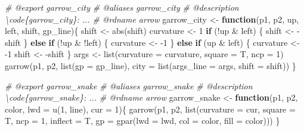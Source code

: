 \documentclass[
]{article}
\newenvironment{Shaded}{\begin{snugshade}}{\end{snugshade}}
\newcommand{\AttributeTok}[1]{\textcolor[rgb]{0.77,0.63,0.00}{#1}}
\newcommand{\CommentTok}[1]{\textcolor[rgb]{0.56,0.35,0.01}{\textit{#1}}}
\newcommand{\ControlFlowTok}[1]{\textcolor[rgb]{0.13,0.29,0.53}{\textbf{#1}}}
\newcommand{\DecValTok}[1]{\textcolor[rgb]{0.00,0.00,0.81}{#1}}
\newcommand{\FunctionTok}[1]{\textcolor[rgb]{0.00,0.00,0.00}{#1}}
\newcommand{\NormalTok}[1]{#1}
\newcommand{\OtherTok}[1]{\textcolor[rgb]{0.56,0.35,0.01}{#1}}
\newcommand{\SpecialCharTok}[1]{\textcolor[rgb]{0.00,0.00,0.00}{#1}}
\begin{document}
\begin{Shaded}
\begin{Highlighting}[]
\CommentTok{\#\textquotesingle{} @export garrow\_city}
\CommentTok{\#\textquotesingle{} @aliases garrow\_city}
\CommentTok{\#\textquotesingle{} @description \textbackslash{}code\{garrow\_city\}: ...}
\CommentTok{\#\textquotesingle{} @rdname arrow}
\NormalTok{garrow\_city }\OtherTok{\textless{}{-}} \ControlFlowTok{function}\NormalTok{(p1, p2, up, left, shift, gp\_line)\{}
\NormalTok{  shift }\OtherTok{\textless{}{-}} \FunctionTok{abs}\NormalTok{(shift)}
\NormalTok{  curvature }\OtherTok{\textless{}{-}} \DecValTok{1}
  \ControlFlowTok{if}\NormalTok{ (}\SpecialCharTok{!}\NormalTok{up }\SpecialCharTok{\&}\NormalTok{ left) \{}
\NormalTok{    shift }\OtherTok{\textless{}{-}} \SpecialCharTok{{-}}\NormalTok{shift}
\NormalTok{  \} }\ControlFlowTok{else} \ControlFlowTok{if}\NormalTok{ (}\SpecialCharTok{!}\NormalTok{up }\SpecialCharTok{\&} \SpecialCharTok{!}\NormalTok{left) \{}
\NormalTok{    curvature }\OtherTok{\textless{}{-}} \SpecialCharTok{{-}}\DecValTok{1}
\NormalTok{  \} }\ControlFlowTok{else} \ControlFlowTok{if}\NormalTok{ (up }\SpecialCharTok{\&}\NormalTok{ left) \{}
\NormalTok{    curvature }\OtherTok{\textless{}{-}} \SpecialCharTok{{-}}\DecValTok{1}
\NormalTok{    shift }\OtherTok{\textless{}{-}} \SpecialCharTok{{-}}\NormalTok{shift}
\NormalTok{  \}}
\NormalTok{  args }\OtherTok{\textless{}{-}} \FunctionTok{list}\NormalTok{(}\AttributeTok{curvature =}\NormalTok{ curvature,}
    \AttributeTok{square =}\NormalTok{ T,}
    \AttributeTok{ncp =} \DecValTok{1}\NormalTok{)}
  \FunctionTok{garrow}\NormalTok{(p1, p2, }\FunctionTok{list}\NormalTok{(}\AttributeTok{gp =}\NormalTok{ gp\_line), }
    \AttributeTok{city =} \FunctionTok{list}\NormalTok{(}\AttributeTok{args\_line =}\NormalTok{ args, }\AttributeTok{shift =}\NormalTok{ shift))}
\NormalTok{\}}

\CommentTok{\#\textquotesingle{} @export garrow\_snake}
\CommentTok{\#\textquotesingle{} @aliases garrow\_snake}
\CommentTok{\#\textquotesingle{} @description \textbackslash{}code\{garrow\_snake\}: ...}
\CommentTok{\#\textquotesingle{} @rdname arrow}
\NormalTok{garrow\_snake }\OtherTok{\textless{}{-}} \ControlFlowTok{function}\NormalTok{(p1, p2, color, }\AttributeTok{lwd =} \FunctionTok{u}\NormalTok{(}\DecValTok{1}\NormalTok{, line), }\AttributeTok{cur =} \DecValTok{1}\NormalTok{)\{}
  \FunctionTok{garrow}\NormalTok{(p1, p2, }\FunctionTok{list}\NormalTok{(}\AttributeTok{curvature =}\NormalTok{ cur, }\AttributeTok{square =}\NormalTok{ T, }\AttributeTok{ncp =} \DecValTok{1}\NormalTok{, }\AttributeTok{inflect =}\NormalTok{ T,}
      \AttributeTok{gp =} \FunctionTok{gpar}\NormalTok{(}\AttributeTok{lwd =}\NormalTok{ lwd, }\AttributeTok{col =}\NormalTok{ color, }\AttributeTok{fill =}\NormalTok{ color)))}
\NormalTok{\}}


\end{Highlighting}
\end{Shaded}
\end{document}
